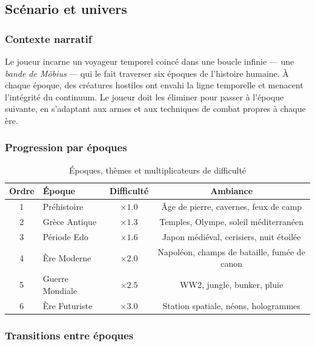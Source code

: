 \documentclass[12pt,a4paper]{article}
\begin{document}
\subsection{Scénario et univers}

\subsubsection*{Contexte narratif}

Le joueur incarne un voyageur temporel coincé dans une boucle infinie --- une \textit{bande de Möbius} --- qui le fait traverser six époques de l'histoire humaine. À chaque époque, des créatures hostiles ont envahi la ligne temporelle et menacent l'intégrité du continuum. Le joueur doit les éliminer pour passer à l'époque suivante, en s'adaptant aux armes et aux techniques de combat propres à chaque ère.

\subsubsection*{Progression par époques}

\begin{table}[H]
\centering
\caption{Époques, thèmes et multiplicateurs de difficulté}
\renewcommand{\arraystretch}{1.35}
\begin{tabular}{@{}clcc@{}}
\toprule
\rowcolor{tableheadbg}
\textbf{Ordre} & \textbf{Époque} & \textbf{Difficulté} & \textbf{Ambiance} \\
\midrule
1 & Préhistoire     & $\times 1.0$ & Âge de pierre, cavernes, feux de camp \\
\rowcolor{rowaltbg}
2 & Grèce Antique   & $\times 1.3$ & Temples, Olympe, soleil méditerranéen \\
3 & Période Edo     & $\times 1.6$ & Japon médiéval, cerisiers, nuit étoilée \\
\rowcolor{rowaltbg}
4 & Ère Moderne     & $\times 2.0$ & Napoléon, champs de bataille, fumée de canon \\
5 & Guerre Mondiale & $\times 2.5$ & WW2, jungle, bunker, pluie \\
\rowcolor{rowaltbg}
6 & Ère Futuriste   & $\times 3.0$ & Station spatiale, néons, hologrammes \\
\bottomrule
\end{tabular}
\end{table}

\subsubsection*{Transitions entre époques}
\end{document}
